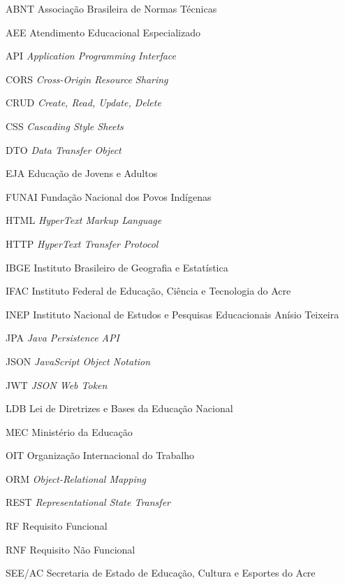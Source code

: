 \documentclass[12pt,a4paper,oneside]{abntspiifac}
\begin{document}
\pretextual

\inserecapa


\begin{siglas}
  \item[ABNT]   Associação Brasileira de Normas Técnicas
  \item[AEE]    Atendimento Educacional Especializado
  \item[API]    \textit{Application Programming Interface}
  \item[CORS]   \textit{Cross-Origin Resource Sharing}
  \item[CRUD]   \textit{Create, Read, Update, Delete}
  \item[CSS]    \textit{Cascading Style Sheets}
  \item[DTO]    \textit{Data Transfer Object}
  \item[EJA]    Educação de Jovens e Adultos
  \item[FUNAI]  Fundação Nacional dos Povos Indígenas
  \item[HTML]   \textit{HyperText Markup Language}
  \item[HTTP]   \textit{HyperText Transfer Protocol}
  \item[IBGE]   Instituto Brasileiro de Geografia e Estatística
  \item[IFAC]   Instituto Federal de Educação, Ciência e Tecnologia do Acre
  \item[INEP]   Instituto Nacional de Estudos e Pesquisas Educacionais Anísio Teixeira
  \item[JPA]    \textit{Java Persistence API}
  \item[JSON]   \textit{JavaScript Object Notation}
  \item[JWT]    \textit{JSON Web Token}
  \item[LDB]    Lei de Diretrizes e Bases da Educação Nacional
  \item[MEC]    Ministério da Educação
  \item[OIT]    Organização Internacional do Trabalho
  \item[ORM]    \textit{Object-Relational Mapping}
  \item[REST]   \textit{Representational State Transfer}
  \item[RF]     Requisito Funcional
  \item[RNF]    Requisito Não Funcional
  \item[SEE/AC] Secretaria de Estado de Educação, Cultura e Esportes do Acre

\end{siglas}
\end{document}
